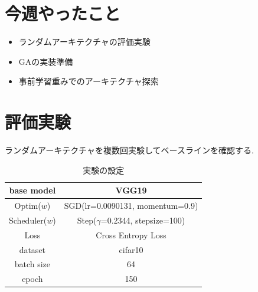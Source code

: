 \documentclass[twocolumn]{jarticle}     %
\begin{document}


\section{今週やったこと}
\begin{itemize}
  \item ランダムアーキテクチャの評価実験
  \item GAの実装準備
  \item 事前学習重みでのアーキテクチャ探索
\end{itemize}

\section{評価実験}

ランダムアーキテクチャを複数回実験してベースラインを確認する.

\begin{table}[tb]
  \begin{center}
    \caption{実験の設定}
    \begin{tabular}{|c|c|} \hline
      base model & VGG19 \\ \hline
      Optim($w$) & SGD(lr=0.0090131, momentum=0.9) \\ \hline
      Scheduler($w$) & Step($\gamma$=0.2344, stepsize=100) \\ \hline
      Loss & Cross Entropy Loss \\ \hline
      dataset & cifar10 \\ \hline
      batch size & 64 \\ \hline
      epoch & 150 \\ \hline
    \end{tabular}
    \label{tab:setting}
  \end{center}
\end{table}
\end{document}

